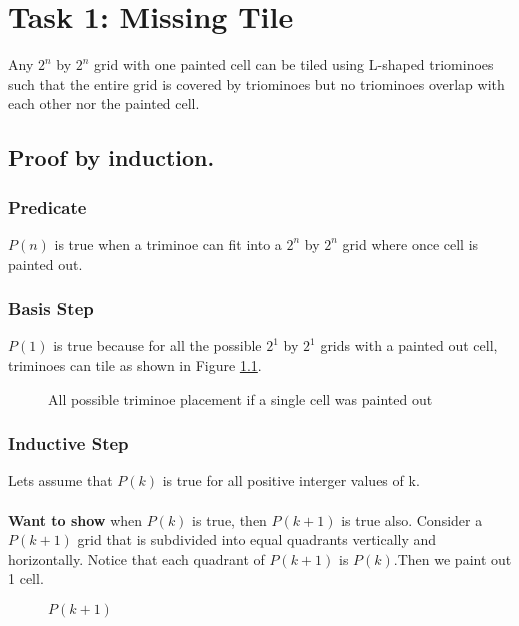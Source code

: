 \chapter{Task 1: Missing Tile}
\begin{thm}[]
	Any $2^n$ by $2^n$
	grid with one painted cell can be tiled using L-shaped triominoes
	such that the entire grid is covered by triominoes but no triominoes overlap with each other
	nor the painted cell. 
	\par
\end{thm}	


\section{Proof by induction.}
\subsection{Predicate}
$P(n)$ is true when a triminoe can fit into a $2^n$ by $2^n$ grid where once cell is painted out.

\subsection{Basis Step}
$P(1)$ is true because for all the possible $2^1$ by $2^1$ grids with a painted out cell, triminoes can tile as shown in Figure \ref{fig:base-cases}. 

\begin{figure}[h]
	\centering
	\caption{All possible triminoe placement if a single cell was painted out}
	\label{fig:base-cases}
\end{figure}

\subsection{Inductive Step}
Lets assume that $P(k)$ is true for all positive interger values of k.\\\\
\textbf{Want to show} when $P(k)$ is true, then $P(k+1)$ is true also.
Consider a $P(k+1)$ grid that is subdivided into equal quadrants vertically and horizontally. Notice that each quadrant of $P(k+1)$ is $P(k)$.Then we paint out 1 cell.\\

\begin{figure}[ht]
	\vspace{-10pt}
	\centering
	\vspace{-10pt}
	\caption{$P(k+1)$}
	\label{fig:T1-figure2}
\end{figure}

